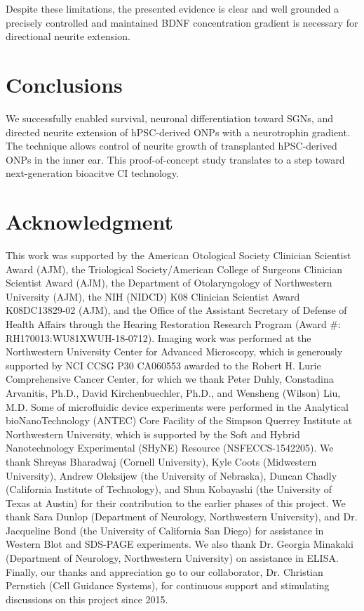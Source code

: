 \documentclass[review]{elsarticle}
\begin{document}
\indent Despite these limitations, the presented evidence is clear and well grounded \textendash a precisely controlled and maintained BDNF concentration gradient is necessary for directional neurite extension.

\section* {Conclusions}
We successfully enabled survival, neuronal differentiation toward SGNs, and directed neurite extension of hPSC-derived ONPs with a neurotrophin gradient. The technique allows control of neurite growth of transplanted hPSC-derived ONPs in the inner ear. This proof-of-concept study translates to a step toward next-generation bioacitve CI technology. 

\section* {Acknowledgment}	
This work was supported by the American Otological Society Clinician Scientist Award (AJM), the Triological Society/American College of Surgeons Clinician Scientist Award (AJM), the Department of Otolaryngology of Northwestern University (AJM), the NIH (NIDCD) K08 Clinician Scientist Award K08DC13829-02 (AJM), and the Office of the Assistant Secretary of Defense of Health Affairs through the Hearing Restoration Research Program (Award \#: RH170013:WU81XWUH-18-0712). Imaging work was performed at the Northwestern University Center for Advanced Microscopy, which is generously supported by NCI CCSG P30 CA060553 awarded to the Robert H. Lurie Comprehensive Cancer Center, for which we thank Peter Duhly, Constadina Arvanitis, Ph.D., David Kirchenbuechler, Ph.D., and Wensheng (Wilson) Liu, M.D.  Some of microfluidic device experiments were performed in the Analytical bioNanoTechnology (ANTEC) Core Facility of the Simpson Querrey Institute at Northwestern University, which is supported by the Soft and Hybrid Nanotechnology Experimental (SHyNE) Resource (NSFECCS-1542205). We thank Shreyas Bharadwaj (Cornell University), Kyle Coots (Midwestern University), Andrew Oleksijew (the University of Nebraska), Duncan Chadly (California Institute of Technology), and Shun Kobayashi (the University of Texas at Austin) for their contribution to the earlier phases of this project. We thank Sara Dunlop (Department of Neurology, Northwestern University), and Dr. Jacqueline Bond (the University of California San Diego) for assistance in Western Blot and SDS-PAGE experiments. We also thank Dr. Georgia Minakaki (Department of Neurology, Northwestern University) on assistance in ELISA. Finally, our thanks and appreciation go to our collaborator, Dr. Christian Pernstich (Cell Guidance Systems), for continuous support and stimulating discussions on this project since 2015. 





\end{document}
